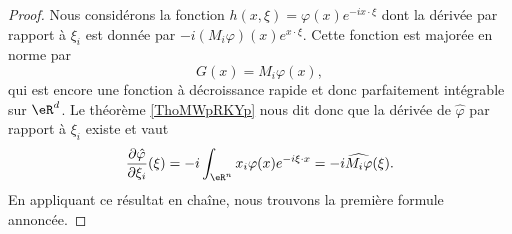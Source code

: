 \begin{proof}
    Nous considérons la fonction \( h(x,\xi)=\varphi(x) e^{-ix\cdot \xi}\) dont la dérivée par rapport à \( \xi_i\) est donnée par \( -i(M_{i}\varphi)(x) e^{x\cdot \xi}\). Cette fonction est majorée en norme par
    \begin{equation}
        G(x)=M_i\varphi(x),
    \end{equation}
    qui est encore une fonction à décroissance rapide et donc parfaitement intégrable sur \( \eR^d\). Le théorème \ref{ThoMWpRKYp} nous dit donc que la dérivée de \( \hat \varphi\) par rapport à \( \xi_i\) existe et vaut
    \begin{equation}
        \frac{ \partial \hat\varphi }{ \partial \xi_i }(\xi)=-i\int_{\eR^n}x_i\varphi(x) e^{-i\xi\cdot x}=-i\widehat{M_i\varphi}(\xi).
    \end{equation}
    En appliquant ce résultat en chaîne, nous trouvons la première formule annoncée.


\end{proof}

